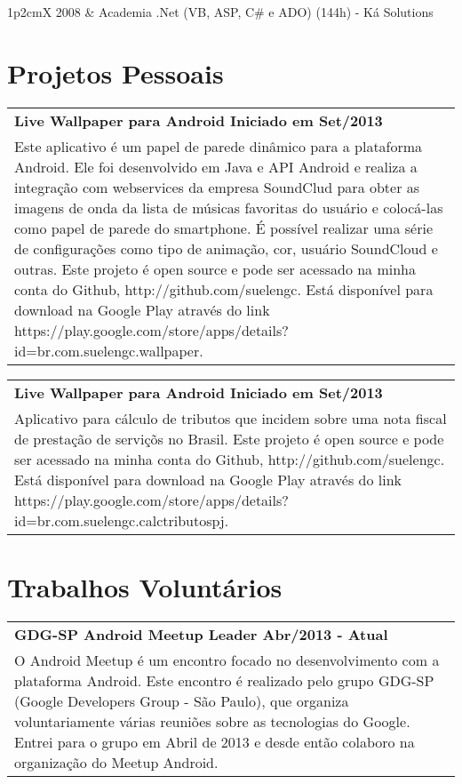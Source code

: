 \documentclass[a4paper, oneside, final]{scrartcl}
\newcommand{\vspc}{\vspace{0.15cm}} %
\begin{document}
\begin{center}
\begin{tabularx}{1\linewidth}{p{2cm}X}
2008       & Academia .Net (VB, ASP, C\# e ADO) (144h) - Ká Solutions 
\end{tabularx}

\section{Projetos Pessoais}
\begin{tabularx}{1\linewidth}{X}
{\bf Live Wallpaper para Android \hfill Iniciado em Set/2013} \\
Este aplicativo é um papel de parede dinâmico para a plataforma Android. Ele foi desenvolvido em Java e API Android e realiza a integração com webservices da empresa SoundClud para obter as imagens de onda da lista de músicas favoritas do usuário e colocá-las como papel de parede do smartphone. É possível realizar uma série de configurações como tipo de animação, cor, usuário SoundCloud e outras. Este projeto é open source e pode ser acessado na minha conta do Github, http://github.com/suelengc. Está disponível para download na Google Play através do link https://play.google.com/store/apps/details?id=br.com.suelengc.wallpaper. \vspc\\
\end{tabularx}

\begin{tabularx}{1\linewidth}{X}
{\bf Live Wallpaper para Android \hfill Iniciado em Set/2013} \\
Aplicativo para cálculo de tributos que incidem sobre uma nota fiscal de prestação de serviçõs no Brasil. Este projeto é open source e pode ser acessado na minha conta do Github, http://github.com/suelengc. Está disponível para download na Google Play através do link https://play.google.com/store/apps/details?id=br.com.suelengc.calctributospj. \vspc\\
\end{tabularx}

\section{Trabalhos Voluntários}
\begin{tabularx}{1\linewidth}{X}
{\bf GDG-SP Android Meetup Leader \hfill Abr/2013 - Atual} \\
O Android Meetup é um encontro focado no desenvolvimento com a plataforma Android. Este encontro é realizado pelo grupo GDG-SP (Google Developers Group - São Paulo), que organiza voluntariamente várias reuniões sobre as tecnologias do Google. Entrei para o grupo em Abril de 2013 e desde então colaboro na organização do Meetup Android. \vspc\\
\end{tabularx}


\end{center}
\end{document}
